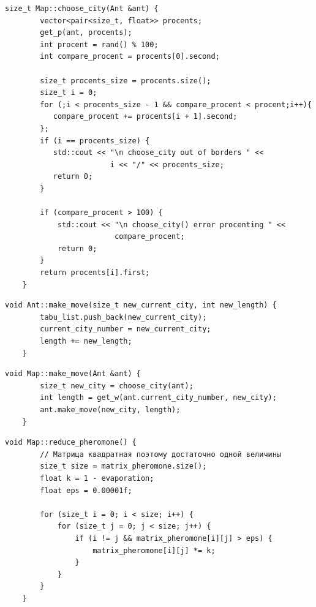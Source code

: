 \documentclass[a4paper, 14pt]{article}
\begin{document}
	\begin{lstlisting}[label=code:choose_city,caption=Функция choose\_city - Выбрать следующий город для муравья]
        size_t Map::choose_city(Ant &ant) {
        vector<pair<size_t, float>> procents;
        get_p(ant, procents);
        int procent = rand() % 100;
        int compare_procent = procents[0].second;
    
        size_t procents_size = procents.size();
        size_t i = 0;
        for (;i < procents_size - 1 && compare_procent < procent;i++){
           compare_procent += procents[i + 1].second;
        };
        if (i == procents_size) {
           std::cout << "\n choose_city out of borders " <<
                        i << "/" << procents_size;
           return 0;
        }
    
        if (compare_procent > 100) {
            std::cout << "\n choose_city() error procenting " <<
                         compare_procent;
            return 0;
        }
        return procents[i].first;
    }
	\end{lstlisting}
	
	\begin{lstlisting}[label=code:ant_make_move,caption=Функция ant::make\_movе]
    void Ant::make_move(size_t new_current_city, int new_length) {
        tabu_list.push_back(new_current_city);
        current_city_number = new_current_city;
        length += new_length;
    }
	\end{lstlisting}
	
	\begin{lstlisting}[label=code:map_make_move,caption=Функция map::make\_move]
    void Map::make_move(Ant &ant) {
        size_t new_city = choose_city(ant);
        int length = get_w(ant.current_city_number, new_city);
        ant.make_move(new_city, length);
    }
	\end{lstlisting}
	
	\begin{lstlisting}[label=code:reduce_pheromone,caption=Функция reduce\_pheromone - уменьшает количество феромонов на всех узлах матрицы феромонов ]
            void Map::reduce_pheromone() {
        // Матрица квадратная поэтому достаточно одной величины
        size_t size = matrix_pheromone.size();
        float k = 1 - evaporation;
        float eps = 0.00001f;
    
        for (size_t i = 0; i < size; i++) {
            for (size_t j = 0; j < size; j++) {
                if (i != j && matrix_pheromone[i][j] > eps) {
                    matrix_pheromone[i][j] *= k;
                }
            }
        }
    }
	\end{lstlisting}
	
\end{document}
